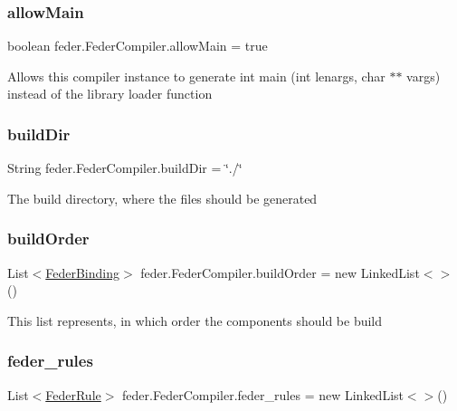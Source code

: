 \subsubsection{\texorpdfstring{allow\+Main}{allowMain}}
{\footnotesize\ttfamily boolean feder.\+Feder\+Compiler.\+allow\+Main = true}

Allows this compiler instance to generate \textquotesingle{}int main (int lenargs, char $\ast$$\ast$ vargs)\textquotesingle{} instead of the library loader function \mbox{\label{classfeder_1_1FederCompiler_a6bd58a0bde5e940c88c2865bf64bebd8}} 
\subsubsection{\texorpdfstring{build\+Dir}{buildDir}}
{\footnotesize\ttfamily String feder.\+Feder\+Compiler.\+build\+Dir = \char`\"{}./\char`\"{}}

The build directory, where the files should be generated \mbox{\label{classfeder_1_1FederCompiler_ab971df77c967493bc7aa312233aeb24a}} 
\subsubsection{\texorpdfstring{build\+Order}{buildOrder}}
{\footnotesize\ttfamily List$<$\hyperlink{classfeder_1_1types_1_1FederBinding}{Feder\+Binding}$>$ feder.\+Feder\+Compiler.\+build\+Order = new Linked\+List$<$$>$()}

This list represents, in which order the components should be build \mbox{\label{classfeder_1_1FederCompiler_ae1a246f2474872537f0ac3ad3bc6dd79}} 
\subsubsection{\texorpdfstring{feder\+\_\+rules}{feder\_rules}}
{\footnotesize\ttfamily List$<$\hyperlink{classfeder_1_1types_1_1FederRule}{Feder\+Rule}$>$ feder.\+Feder\+Compiler.\+feder\+\_\+rules = new Linked\+List$<$$>$()}

